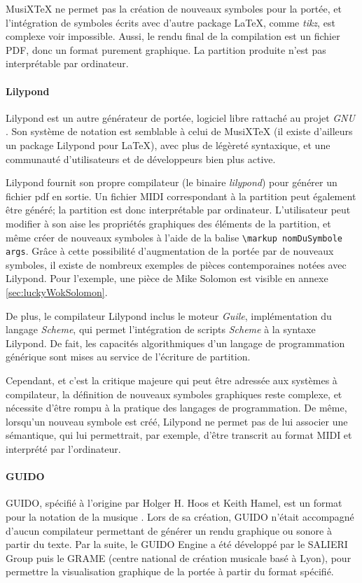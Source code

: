 MusiXTeX ne permet pas la création de nouveaux symboles pour la portée, et l'intégration de symboles écrits avec d'autre package \LaTeX, comme \textit{tikz}, est complexe voir impossible.
Aussi, le rendu final de la compilation est un fichier PDF, donc un format purement graphique. La partition produite n'est pas interprétable par ordinateur.

\paragraph{Lilypond} Lilypond est un autre générateur de portée, logiciel libre rattaché au projet \textit{GNU} \cite{lilypond2018}. Son système de notation est semblable à celui de MusiXTeX (il existe d'ailleurs un package Lilypond pour \LaTeX), avec plus de légèreté syntaxique, et une communauté d'utilisateurs et de développeurs bien plus active.

Lilypond fournit son propre compilateur (le binaire \textit{lilypond}) pour générer un fichier pdf en sortie. Un fichier MIDI correspondant à la partition peut également être généré; la partition est donc interprétable par ordinateur.
L'utilisateur peut modifier à son aise les propriétés graphiques des éléments de la partition, et même créer de nouveaux symboles à l'aide de la balise \lstinline|\markup nomDuSymbole args|. Grâce à cette possibilité d'augmentation de la portée par de nouveaux symboles, il existe de nombreux exemples de pièces contemporaines notées avec Lilypond. Pour l'exemple, une pièce de Mike Solomon est visible en annexe \ref{sec:luckyWokSolomon}.

De plus, le compilateur Lilypond inclus le moteur \textit{Guile}, implémentation du langage \textit{Scheme}, qui permet l'intégration de scripts \textit{Scheme} à la syntaxe Lilypond. De fait, les capacités algorithmiques d'un langage de programmation générique sont mises au service de l'écriture de partition.

Cependant, et c'est la critique majeure qui peut être adressée aux systèmes à compilateur, la définition de nouveaux symboles graphiques reste complexe, et nécessite d'être rompu à la pratique des langages de programmation.
De même, lorsqu'un nouveau symbole est créé, Lilypond ne permet pas de lui associer une sémantique, qui lui permettrait, par exemple, d'être transcrit au format MIDI et interprété par l'ordinateur.

\paragraph{GUIDO} GUIDO, spécifié à l'origine par Holger H. Hoos et Keith Hamel, est un format pour la notation de la musique \cite{hoos1998}. Lors de sa création, GUIDO n'était accompagné d'aucun compilateur permettant de générer un rendu graphique ou sonore à partir du texte. Par la suite, le GUIDO Engine a été développé par le SALIERI Group puis le GRAME (centre national de création musicale basé à Lyon), pour permettre la visualisation graphique de la portée à partir du format spécifié. 

